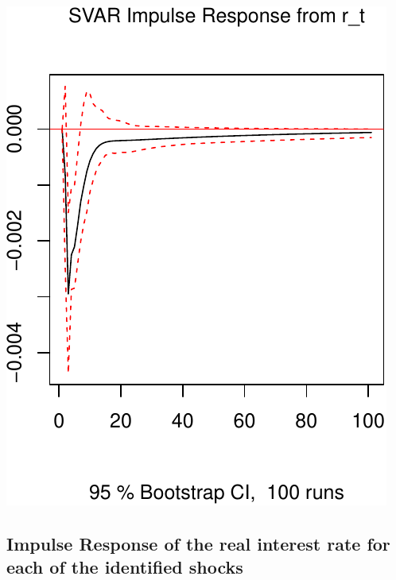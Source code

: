 \documentclass[11pt,preprint, authoryear]{elsarticle}
\numberwithin{equation}{section}
\numberwithin{figure}{section}
\numberwithin{table}{section}
\begin{document}
\includegraphics{TS_proj_files/figure-latex/unnamed-chunk-20-1.pdf}

\hypertarget{impulse-response-of-the-real-interest-rate-for-each-of-the-identified-shocks}{%
\subsection{Impulse Response of the real interest rate for each of the
identified
shocks}\label{impulse-response-of-the-real-interest-rate-for-each-of-the-identified-shocks}}
\end{document}
